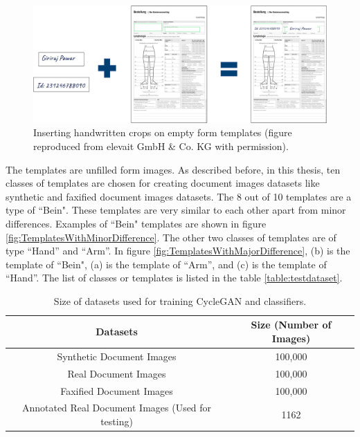 \begin{figure}[H]
        \begin{center}
	    \includegraphics[scale=0.40]{images/Implementation/InsertHandwrittenCrops.png}
	    \caption[Inserting handwritten crops on empty form templates.]{Inserting handwritten crops on empty form templates (figure reproduced from elevait GmbH \& Co. KG with permission).}
	    \label{fig:InsertHandwrittenCrops}
	    \end{center}
\end{figure}



The templates are unfilled form images. As described before, in this thesis, ten classes of templates are chosen for creating document images datasets like synthetic and faxified document images datasets. The 8 out of 10 templates are a type of ``Bein". These templates are very similar to each other apart from minor differences. Examples of ``Bein" templates are shown in figure \ref{fig:TemplatesWithMinorDifference}. The other two classes of templates are of type ``Hand'' and ``Arm''. In figure \ref{fig:TemplatesWithMajorDifference}, (b) is the template of ``Bein", (a) is the template of ``Arm'', and (c) is the template of ``Hand''. The list of classes or templates is listed in the table \ref{table:testdataset}.

\begin{center}
    \begin{table}[H]
    \begin{center}
    \begin{tabular}{||c c||} 
    \hline
    \textbf{Datasets} & \textbf{Size (Number of Images)}\\ [0.5ex] 
    \hline\hline
    Synthetic Document Images & 100,000 \\ 
    \hline
    Real Document Images & 100,000 \\
    \hline
    Faxified Document Images & 100,000 \\
    \hline
    Annotated Real Document Images (Used for testing) & 1162 \\
    \hline
    \end{tabular}
    \end{center}
    \caption{Size of datasets used for training \ac{CycleGAN} and classifiers.}
    \label{table:datasets}
    \end{table}
\end{center}



